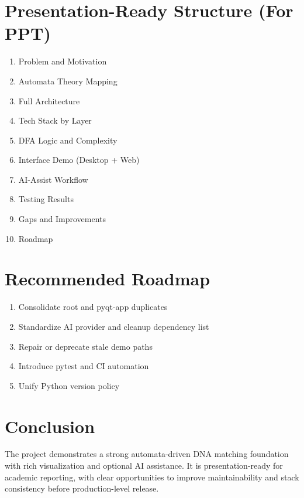 \documentclass[11pt]{article}
\begin{document}
\section{Presentation-Ready Structure (For PPT)}
\begin{enumerate}[leftmargin=*]
  \item Problem and Motivation
  \item Automata Theory Mapping
  \item Full Architecture
  \item Tech Stack by Layer
  \item DFA Logic and Complexity
  \item Interface Demo (Desktop + Web)
  \item AI-Assist Workflow
  \item Testing Results
  \item Gaps and Improvements
  \item Roadmap
\end{enumerate}

\section{Recommended Roadmap}
\begin{enumerate}[leftmargin=*]
  \item Consolidate root and pyqt-app duplicates
  \item Standardize AI provider and cleanup dependency list
  \item Repair or deprecate stale demo paths
  \item Introduce pytest and CI automation
  \item Unify Python version policy
\end{enumerate}

\section{Conclusion}
The project demonstrates a strong automata-driven DNA matching foundation with rich visualization and optional AI assistance. It is presentation-ready for academic reporting, with clear opportunities to improve maintainability and stack consistency before production-level release.
\end{document}

